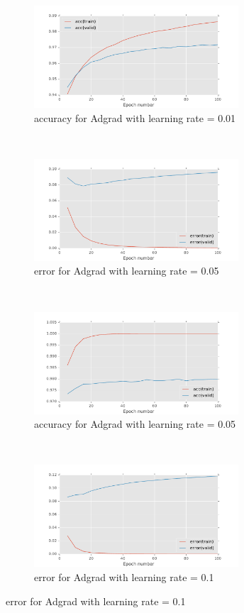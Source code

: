 \documentclass[11pt]{article}
\begin{document}
\begin{figure}[t!]
\begin{subfigure}[t]{0.45\textwidth}
        \centering
        \includegraphics[height=1.5in]{acc_with_Adgrad_0_01.pdf}
        \caption{accuracy for Adgrad with learning rate = 0.01}
    \end{subfigure}    
	~
    \begin{subfigure}[t]{0.45\textwidth}
        \centering
        \includegraphics[height=1.5in]{error_with_Adgrad_0_05.pdf}
        \caption{error for Adgrad with learning rate = 0.05}
    \end{subfigure}   
    ~
    \begin{subfigure}[t]{0.45\textwidth}
        \centering
        \includegraphics[height=1.5in]{acc_with_Adgrad_0_05.pdf}
        \caption{accuracy for Adgrad with learning rate = 0.05}
    \end{subfigure}    
	~
    \begin{subfigure}[t]{0.45\textwidth}
        \centering
        \includegraphics[height=1.5in]{error_with_Adgrad_0_1.pdf}
        \caption{error for Adgrad with learning rate = 0.1}

\end{subfigure}
\end{figure}
\end{document}
